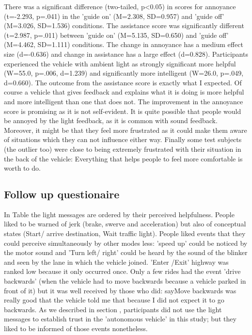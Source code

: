 There was a significant difference (two-tailed, p<0.05) in scores for annoyance (t=-2.293, p=.041) in the 'guide on' (M=2.308, SD=0.957) and 'guide off' (M=3.026, SD=1.536) conditions. 
The assistance score was significantly different (t=2.987, p=.011) between 'guide on' (M=5.135, SD=0.650) and 'guide off' (M=4.462, SD=1.111) conditions. The change in annoyance has a medium effect size (d=-0.636) and change in assistance has a large effect (d=0.828). Participants experienced the vehicle with ambient light as strongly significant more helpful (W=55.0, p=.006, d=1.239) and significantly more intelligent (W=26.0, p=.049, d=0.660). The outcome from the assistance score is exactly what I expected. Of course a vehicle that gives feedback and explains what it is doing is more helpful and more intelligent than one that does not. The improvement in the annoyance score is promising as it is not self-evident. It is quite possible that people would be annoyed by the light feedback, as it is common with sound feedback. Moreover, it might be that they feel more frustrated as it could make them aware of situations which they can not influence either way. Finally some test subjects (the outlier too) were close to being extremely frustrated with their situation in the back of the vehicle: Everything that helps people to feel more comfortable is worth to do. 


\subsection{Follow up questionaire}
In Table  the light messages are ordered by their perceived helpfulness. People liked to be warned of jerk (brake, swerve and acceleration) but also of conceptual states (Start/ arrive destination, Wait traffic light). People liked events that they could perceive simultaneously by other modes less: 'speed up' could be noticed by the motor sound and 'Turn left/ right' could be heard by the sound of the blinker and seen by the lane in which the vehicle joined. 'Enter /Exit' highway was ranked low because it only occurred once. Only a few rides had the event 'drive backwards' (when the vehicle had to move backwards because a vehicle parked in front of it) but it was well received by those who did: say{Move backwards was really good that the vehicle told me that because I did not expect it to go backwards}. As we described in section , participants did not use the light messages to establish trust in the 'autonomous vehicle' in this study; but they liked to be informed of those events nonetheless. 

